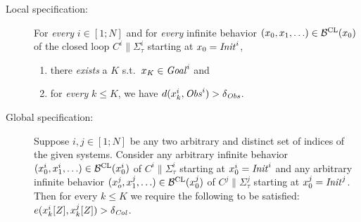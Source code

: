 \begin{description}
	\item[Local specification:] For \emph{every} $i\in [1;N]$ and for \emph{every} infinite behavior $(x_0,x_1,\ldots)\in \mathcal{B}^{\mathrm{CL}}(x_0)$ of the closed loop $C^i\parallel \Sigma_\tau^i$ starting at $x_0=\mathit{Init}^i$,
		\begin{enumerate}
			\item there \emph{exists} a $K$ s.t.\ $x_K\in \mathit{Goal}^i$ and
			 \item for \emph{every} $k\leq K$, we have $d(x^i_k,\mathit{Obs}^i)>\delta_{\mathit{Obs}}$. 
		\end{enumerate}
	\item[Global specification:] 
		Suppose $i,j\in [1;N]$ be any two arbitrary and distinct set of indices of the given systems.
		Consider any arbitrary infinite behavior $(x_0^i,x_1^i,\ldots)\in \mathcal{B}^{\mathrm{CL}}(x_0^i)$ of $C^i\parallel \Sigma_\tau^i$ starting at $x_0^i=\mathit{Init}^i$ 
		and any arbitrary infinite behavior $(x_o^j, x_1^j,\ldots)\in \mathcal{B}^{\mathrm{CL}}(x_0^j)$ of $C^j\parallel \Sigma_\tau^j$ starting at $x_0^j=\mathit{Init}^j$. 
		Then for every $k\leq K$ we require the following to be satisfied: $e(x^i_k[Z],x^j_k[Z])>\delta_{\mathit{Col}}$.
\end{description}

